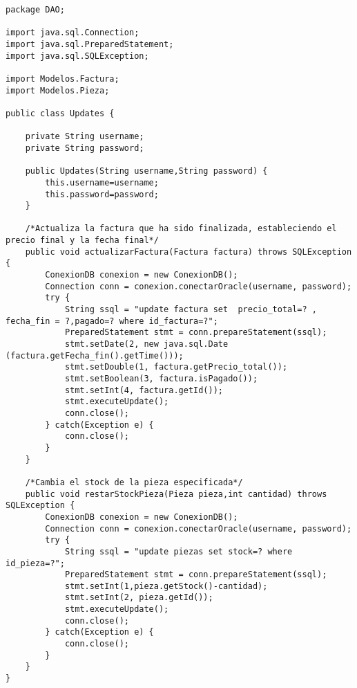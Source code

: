 \clearpage
\begin{lstlisting}[caption=Updates.java (App Escritorio)]
package DAO;

import java.sql.Connection;
import java.sql.PreparedStatement;
import java.sql.SQLException;

import Modelos.Factura;
import Modelos.Pieza;

public class Updates {
	
	private String username;
	private String password;
	
	public Updates(String username,String password) {
		this.username=username;
		this.password=password;
	}
	
	/*Actualiza la factura que ha sido finalizada, estableciendo el precio final y la fecha final*/
	public void actualizarFactura(Factura factura) throws SQLException {
		ConexionDB conexion = new ConexionDB();
		Connection conn = conexion.conectarOracle(username, password);
		try {
			String ssql = "update factura set  precio_total=? , fecha_fin = ?,pagado=? where id_factura=?";
			PreparedStatement stmt = conn.prepareStatement(ssql);
			stmt.setDate(2, new java.sql.Date (factura.getFecha_fin().getTime()));
			stmt.setDouble(1, factura.getPrecio_total());
			stmt.setBoolean(3, factura.isPagado());
			stmt.setInt(4, factura.getId());
			stmt.executeUpdate();
			conn.close();
		} catch(Exception e) {
			conn.close();
		}
	}
	
	/*Cambia el stock de la pieza especificada*/
	public void restarStockPieza(Pieza pieza,int cantidad) throws SQLException {
		ConexionDB conexion = new ConexionDB();
		Connection conn = conexion.conectarOracle(username, password);
		try {
			String ssql = "update piezas set stock=? where id_pieza=?";
			PreparedStatement stmt = conn.prepareStatement(ssql);
			stmt.setInt(1,pieza.getStock()-cantidad);
			stmt.setInt(2, pieza.getId());
			stmt.executeUpdate();
			conn.close();
		} catch(Exception e) {
			conn.close();
		}
	}
}
\end{lstlisting}
\clearpage